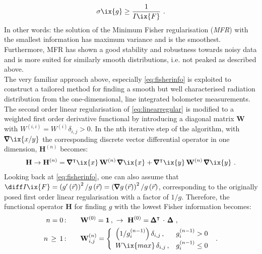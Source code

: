 %
        \begin{align}%
            \sigma\ix{g}\ge\frac{1}{I\ix{F}}\,\,.\nonumber%
        \end{align}%
%
        In other words: the solution of the Minimum Fisher regularisation (\textit{MFR}) with the smallest information has maximum variance and is the smoothest. Furthermore, MFR has shown a good stability and robustness towards noisy data and is more suited for similarly smooth distributions, i.e. not peaked as described above\cite{Frieden1988,Frieden2012}.\\%
        The very familiar approach above, especially \cref{eq:fisherinfo} is exploited to construct a tailored method for finding a smooth but well characterised radiation distribution from the one-dimensional, line integrated bolometer measurements. The second order linear regularisation of \cref{eq:linearregular} is modified to a weighted first order derivative functional by introducing a diagonal matrix $\mathbf{W}$ with $W^{\left(i,i\right)}=W^{\left(i\right)}\delta_{i,j}>0$. In the nth iterative step of the algorithm, with $\pmb{\nabla}\ix{x/y}$ the corresponding discrete vector differential operator in one dimension, $\mathbf{H}^{\left(n\right)}$ becomes:
%
        \begin{align}%
            \mathbf{H}\to\mathbf{H}^{\left(n\right)}=\pmb{\nabla}^{\intercal}\ix{x}\,\mathbf{W}^{\left(n\right)}\,\pmb{\nabla}\ix{x}+\pmb{\nabla}^{\intercal}\ix{y}\,\mathbf{W}^{\left(n\right)}\,\pmb{\nabla}\ix{y}\,\,.%
        \end{align}%
%
        Looking back at \cref{eq:fisherinfo}, one can also assume that $\diff I\ix{F}=\left(g^{\prime}\left(\vec{r}\right)\right)^{2}/g\left(\vec{r}\right)=\left(\pmb{\nabla}g\left(\vec{r}\right)\right)^{2}/g\left(\vec{r}\right)$, corresponding to the originally posed first order linear regularisation with a factor of $1/g$. Therefore, the functional operator $\mathbf{H}$ for finding $g$ with the lowest Fisher information becomes:%
%
        \begin{align}%
            \begin{split}%
                n=0\,\text{:}&\qquad\mathbf{W}^{\left(0\right)}=\mathbf{1}\,,\,\,\to\,\,\mathbf{H}^{\left(0\right)}=\pmb{\Delta}^{\intercal}\,\cdot\,\pmb{\Delta}\,\,,\\%
                n\,\ge\,1\,\text{:}&\qquad \mathbf{W}^{\left(n\right)}_{i,j}=\left\{\begin{array}{ll}%
                    \left(1/g_{i}^{\left(n-1\right)}\right)\delta_{i,j}\,,&g_{i}^{\left(n-1\right)}>0\\%
                    W\ix{max}\,\delta_{i,j}\,,&g_{i}^{\left(n-1\right)}\le0%
                \end{array}\right.\,\,.%
            \end{split}\label{eq:fisher_weight}%
        \end{align}%
